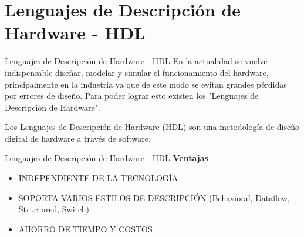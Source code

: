 \documentclass[11pt]{beamer}
\begin{document}

	\section{Lenguajes de Descripción de Hardware - HDL}
	
	\begin{frame}{Lenguajes de Descripción de Hardware - HDL}
		En la actualidad se vuelve indispensable diseñar, modelar y simular el funcionamiento del hardware, principalmente en la industria ya que de este modo se evitan grandes pérdidas por errores de diseño. Para poder lograr esto existen los "Lenguajes de Descripción de Hardware".\newline
		
		Los Lenguajes de Descripción de Hardware (HDL) son una metodología de diseño digital de hardware a través de software.
		
	\end{frame}
	
	\begin{frame}{Lenguajes de Descripción de Hardware - HDL}
		\textbf{Ventajas} \newline
		
		\begin{itemize}
			\item INDEPENDIENTE DE LA TECNOLOGÍA\newline
			\item SOPORTA VARIOS ESTILOS DE DESCRIPCIÓN (Behavioral, Dataflow, Structured, Switch)\newline
			\item AHORRO DE TIEMPO Y COSTOS\newline
		\end{itemize}
		
		
	\end{frame}
	
\end{document}
